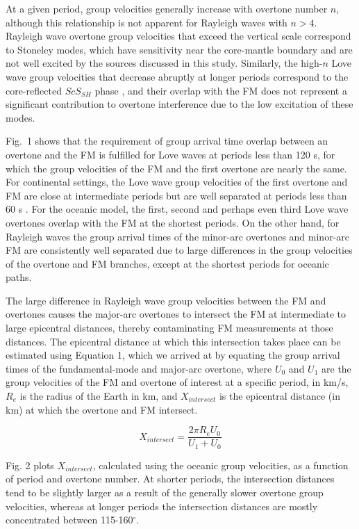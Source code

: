 \documentclass[extra,mreferee]{gji}
\begin{document}
At a given period, group velocities generally increase with  overtone number $n$, although this relationship is not apparent for Rayleigh waves with $n > 4$.  Rayleigh wave overtone group velocities that exceed the vertical scale correspond to Stoneley modes, which have sensitivity near the core-mantle boundary and are not well excited by the sources discussed in this study. Similarly, the high-$n$ Love wave group velocities that decrease abruptly at longer periods correspond to the core-reflected $ScS_{SH}$ phase \citep{dahlen1998theoretical}, and their overlap with the FM does not represent a significant contribution to overtone interference due to the low excitation of these modes.

Fig.\ 1 shows that the requirement of group arrival time overlap between an overtone and the FM is fulfilled for Love waves at periods less than 120 s, for which the group velocities of the FM and the first overtone are nearly the same. For continental settings, the Love wave group velocities of the first overtone and FM are close at intermediate periods but are well separated at periods less than 60 s \citep{nettles2011effect}. For the oceanic model, the first, second and perhaps even third Love wave overtones overlap with the FM at the shortest periods. On the other hand, for Rayleigh waves the group arrival times of the minor-arc overtones and minor-arc FM are consistently well separated due to large differences in the group velocities of the overtone and FM branches, except at the shortest periods for oceanic paths.

The large difference in Rayleigh wave group velocities between the FM and overtones causes the major-arc overtones to intersect the FM at intermediate to large epicentral distances, thereby contaminating FM measurements at those distances. The epicentral distance at which this intersection takes place can be estimated using Equation 1,  which we arrived at by equating the group arrival times of the fundamental-mode and major-arc overtone, where $U_{0}$ and $U_{1}$ are the group velocities of the FM and overtone of interest at a specific period, in km/s, $R_e$ is the radius of the Earth in km, and $X_{intersect}$ is the epicentral distance (in km) at which the overtone and FM intersect.

\begin{equation}
X_{intersect} = \frac{2 \pi R_e U_{0}}{U_1 + U_{0}}
\end{equation}
     
Fig. 2 plots $X_{intersect}$, calculated using the oceanic group velocities, as a function of period and overtone number. At shorter periods, the intersection distances tend to be slightly larger as a result of the generally slower overtone group velocities, whereas at longer periods the intersection distances are mostly concentrated between 115-160$^\circ$. 
       
\end{document}
